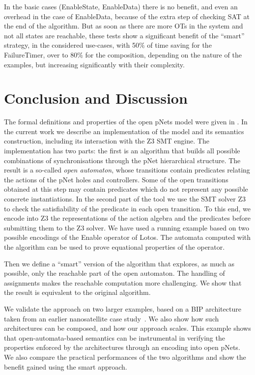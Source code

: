 \documentclass[smallcondensed]{svjour3}
\begin{document}
        \medskip
        In the basic cases (EnableState, EnableData) there is no
        benefit, and even an overhead in the case of EnableData,
        because of the extra step of checking SAT at the end of the
        algorithm.
But as soon as there are more OTs in the system and not all
states are reachable, these tests show a significant benefit of the ``smart'' strategy, in
the considered use-cases, with 50\% of time saving for the FailureTimer,
over to 80\% for the composition, depending
        on the nature of the examples, but increasing significantly
        with their complexity.

\section{Conclusion and Discussion}
\label{section:conclusion}

The formal definitions and properties of the open pNets model were
given in \cite{henrio:Forte2016}. In the current work we describe an implementation of
the model and its semantics construction, including its interaction
with the Z3 SMT engine.
The implementation has two parts: the first is an algorithm
that builds all possible combinations of synchronisations through the
pNet hierarchical structure. The result is a so-called
\emph{open automaton}, whose transitions contain predicates relating
the actions of the pNet holes and controllers. Some of the open
transitions obtained at this step  may
contain predicates which do not represent any possible concrete
instantiations. 
In the second part of the tool we use the SMT solver Z3 to check the
satisfiability of the predicate in each open transition. 
To this end, we encode into Z3 the representations of the action algebra and
the predicates before submitting them to the
Z3 solver. 
%
%
We have used a running example based on two possible
encodings of the Enable operator of Lotos. The automata computed with
the algorithm can be used to prove equational properties of the
operator.

Then we define a ``smart'' version of the algorithm that explores, as
much as possible, only the reachable part of the open automaton. The
handling of assignments makes the reachable computation more
challenging. We show that the result is equivalent to the original
algorithm. 

We validate the approach on two larger examples, 
based on a BIP architecture taken from an earlier nanosatellite case
study~\cite{CubETH-case-study}. We also show how such architectures
can be composed, and how our approach scales.
This example shows that
open-automata-based semantics can be instrumental in verifying the
properties enforced by the architectures through an encoding into open
pNets.
We also compare the practical performances of the two algorithms and
show the benefit gained using the smart approach.
\end{document}
